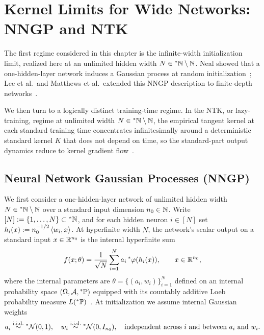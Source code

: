 \chapter{Kernel Limits for Wide Networks: NNGP and NTK}\label{ch:kernels}

The first regime considered in this chapter is the infinite-width initialization limit, realized here at an unlimited hidden width $N \in {}^*\mathbb{N} \setminus \mathbb{N}$. Neal showed that a one-hidden-layer network induces a Gaussian process at random initialization~\cite{neal1996priors}; Lee et al.\ and Matthews et al.\ extended this NNGP description to finite-depth networks~\cite{lee2018deep,matthews2018gaussian}.

We then turn to a logically distinct training-time regime. In the NTK, or lazy-training, regime at unlimited width $N \in {}^*\mathbb{N} \setminus \mathbb{N}$, the empirical tangent kernel at each standard training time concentrates infinitesimally around a deterministic standard kernel $K$ that does not depend on time, so the standard-part output dynamics reduce to kernel gradient flow~\cite{jacot2018neural,lee2019wide}.

\section{Neural Network Gaussian Processes (NNGP)}\label{sec:ch2-nngp}

We first consider a one-hidden-layer network of unlimited hidden width $N \in {}^*\mathbb{N} \setminus \mathbb{N}$ over a standard input dimension $n_0 \in \mathbb{N}$. Write $[N] := \{1, \dots, N\} \subset {}^*\mathbb{N}$, and for each hidden neuron $i \in [N]$ set $h_i(x) := n_0^{-1/2}\left\langle w_i, x \right\rangle$. At hyperfinite width $N$, the network's scalar output on a standard input $x \in \mathbb{R}^{n_0}$ is the internal hyperfinite sum
\begin{equation}\label{eq:ch2-1layer-net}
f(x; \theta) = \frac{1}{\sqrt{N}} \sum_{i=1}^{N} a_i \, {}^*\varphi(h_i(x)), \qquad x \in \mathbb{R}^{n_0},
\end{equation}
where the internal parameters are $\theta = \{(a_i, w_i)\}_{i=1}^{N}$ defined on an internal probability space $(\Omega, \mathcal{A}, {}^*\mathbb{P})$ equipped with its countably additive Loeb probability measure $L({}^*\mathbb{P})$~\cite{loeb1975conversion,cutland2000loeb}. At initialization we assume internal Gaussian weights
\begin{equation}\label{eq:ch2-init-weights}
a_i \stackrel{\text{i.i.d.}}{\sim} {}^*\mathcal{N}(0, 1), \quad
w_i \stackrel{\text{i.i.d.}}{\sim} {}^*\mathcal{N}(0, I_{n_0}), \quad
\text{independent across $i$ and between $a_i$ and $w_i$.}
\end{equation}

